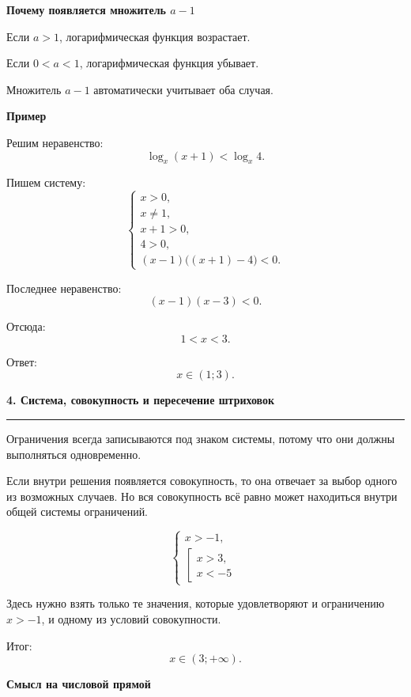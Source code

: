 \documentclass[a4paper,12pt]{article}
\newcommand{\SectionTitle}[1]{%
  \vspace{0.8em}
  {\Large\bfseries\textcolor{darkaccent}{#1}}\par
  \vspace{0.2em}
  {\color{accent}\rule{\linewidth}{0.8pt}}
  \vspace{0.4em}
}
\newcommand{\MiniTitle}[1]{%
  \vspace{0.45em}
  {\bfseries\textcolor{darkaccent}{#1}}\par
}
\begin{document}
\MiniTitle{Почему появляется множитель \(a-1\)}

Если \(a>1\), логарифмическая функция возрастает.

Если \(0<a<1\), логарифмическая функция убывает.

Множитель \(a-1\) автоматически учитывает оба случая.

\MiniTitle{Пример}

Решим неравенство:
\[
\log_x(x+1)<\log_x4.
\]

Пишем систему:
\[
\begin{cases}
x>0,\\
x\ne1,\\
x+1>0,\\
4>0,\\
(x-1)\bigl((x+1)-4\bigr)<0.
\end{cases}
\]

Последнее неравенство:
\[
(x-1)(x-3)<0.
\]

Отсюда:
\[
1<x<3.
\]

Ответ:
\[
\boxed{x\in(1;3)}.
\]

\SectionTitle{4. Система, совокупность и пересечение штриховок}

Ограничения всегда записываются под знаком системы, потому что они должны выполняться одновременно.

Если внутри решения появляется совокупность, то она отвечает за выбор одного из возможных случаев. Но вся совокупность всё равно может находиться внутри общей системы ограничений.

\[
\begin{cases}
x>-1,\\
\left[
\begin{array}{l}
x>3,\\
x<-5
\end{array}
\right.
\end{cases}
\]

Здесь нужно взять только те значения, которые удовлетворяют и ограничению \(x>-1\), и одному из условий совокупности.

Итог:
\[
x\in(3;+\infty).
\]

\MiniTitle{Смысл на числовой прямой}

\begin{center}
\end{center}
\end{document}
